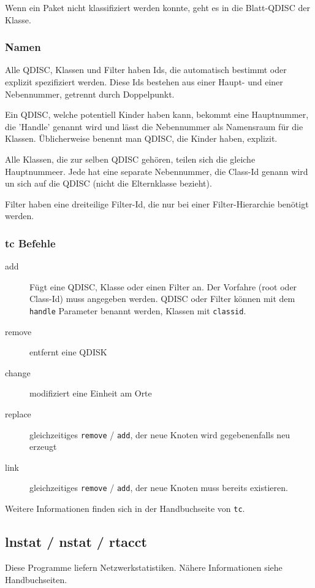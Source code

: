   Wenn ein Paket nicht klassifiziert werden konnte, geht es in die
  Blatt-QDISC der Klasse.

  \subsubsection*{Namen}
  Alle QDISC, Klassen und Filter haben Ids, die automatisch bestimmt oder
  explizit spezifiziert werden. Diese Ids bestehen aus einer Haupt- und einer
  Nebennummer, getrennt durch Doppelpunkt.

  Ein QDISC, welche potentiell Kinder haben kann, bekommt eine Hauptnummer,
  die 'Handle' genannt wird und lässt die Nebennummer als Namensraum für die
  Klassen. Üblicherweise benennt man QDISC, die Kinder haben, explizit.

  Alle Klassen, die zur selben QDISC gehören, teilen sich die gleiche
  Hauptnummeer. Jede hat eine separate Nebennummer, die Class-Id genann wird
  un sich auf die QDISC (nicht die Elternklasse bezieht).

  Filter haben eine dreiteilige Filter-Id, die nur bei einer Filter-Hierarchie
  benötigt werden.

  \subsubsection*{tc Befehle}
  \begin{description}
    \item[add] Fügt eine QDISC, Klasse oder einen Filter an. Der Vorfahre
      (root oder Class-Id) muss angegeben werden. QDISC oder Filter können mit
      dem \verb?handle? Parameter benannt werden, Klassen mit \verb?classid?.
    \item[remove] entfernt eine QDISK
    \item[change] modifiziert eine Einheit am Orte
    \item[replace] gleichzeitiges \verb?remove? / \verb?add?, der neue Knoten
      wird gegebenenfalls neu erzeugt
    \item[link] gleichzeitiges \verb?remove? / \verb?add?, der neue Knoten
      muss bereits existieren.
  \end{description}

  Weitere Informationen finden sich in der Handbuchseite von \verb?tc?.
  \subsection*{lnstat / nstat / rtacct}
  Diese Programme liefern Netzwerkstatistiken. Nähere Informationen siehe
  Handbuchseiten.
